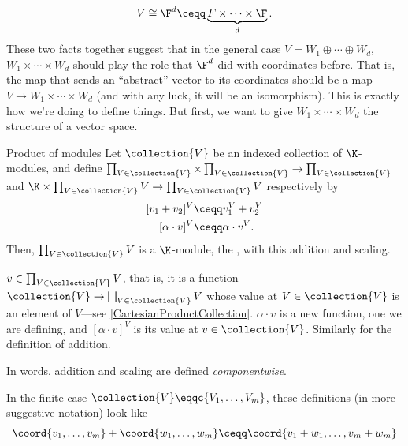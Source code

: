 \begin{equation}
	V\cong \F ^d\ceqq \underbrace{F\times \cdots \times \F}_d.
\end{equation}
These two facts together suggest that in the general case $V=W_1\oplus \cdots \oplus W_d$, $W_1\times \cdots \times W_d$ should play the role that $\F ^d$ did with coordinates before.  That is, the map that sends an ``abstract'' vector to its coordinates should be a map $V\rightarrow W_1\times \cdots \times W_d$ (and with any luck, it will be an isomorphism).  This is exactly how we're doing to define things.  But first, we want to give $W_1\times \cdots \times W_d$ the structure of a vector space.
\begin{prp}{Product of modules}{}
	Let $\collection{V}$ be an indexed collection of $\K$-modules, and define $\prod _{V\in \collection{V}}\times \prod _{V\in \collection{V}}\rightarrow \prod _{V\in \collection{V}}$ and $\K \times \prod _{V\in \collection{V}}V\rightarrow \prod _{V\in \collection{V}}V$ respectively by
	\begin{subequations}
		\begin{align}
			[v_1+v_2]^V & \ceqq v_1^V+v_2^V \\
			[\alpha \cdot v]^V & \ceqq \alpha \cdot v^V.
		\end{align}
	\end{subequations}
	Then, $\prod _{V\in \collection{V}}V$ is a $\K$-module, the , with this addition and scaling.
	\begin{rmk}
		$v\in \prod _{V\in \collection{V}}V$, that is, it is a function $\collection{V}\rightarrow \bigsqcup _{V\in \collection{V}}V$ whose value at $V\in \collection{V}$ is an element of $V$---see \cref{CartesianProductCollection}.  $\alpha \cdot v$ is a new function, one we are defining, and $[\alpha \cdot v]^V$ is its value at $v\in \collection{V}$.  Similarly for the definition of addition.
	\end{rmk}
	\begin{rmk}
		In words, addition and scaling are defined \emph{componentwise}.
	\end{rmk}
	\begin{rmk}
		In the finite case $\collection{V}\eqqc \{ V_1,\ldots ,V_m\}$, these definitions (in more suggestive notation) look like
		\begin{subequations}
			\begin{align}
				\coord{v_1,\ldots ,v_m}+\coord{w_1,\ldots ,w_m} & \ceqq \coord{v_1+w_1,\ldots ,v_m+w_m} \\

\end{align}
\end{subequations}
\end{rmk}
\end{prp}
